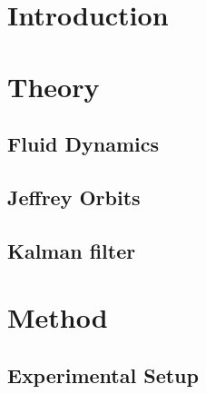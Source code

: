 \documentclass[]{report}
\title{}
\author{Staffan Ankardal}
\begin{document}
\maketitle

\begin{abstract}

\end{abstract}

\newpage
{}
\setcounter{page}{1}
\pagestyle{fancy}
\setspecialhdr
\tableofcontents


\newpage
\setdefaulthdr
{}	
\setcounter{page}{1}

\chapter{Introduction}



\chapter{Theory}


\section{Fluid Dynamics}


\section{Jeffrey Orbits}

\section{Kalman filter}

\chapter{Method}

\section{Experimental Setup}



\end{document}
